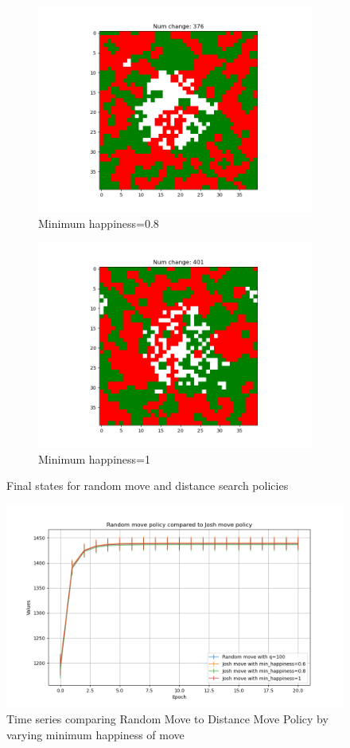 \documentclass[11pt]{article}
\begin{document}
\begin{figure}[h]
\begin{subfigure}{0.14\textwidth}
			\includegraphics[width=\linewidth]{policy4_final_min8.png}
			\caption{\centering Minimum happiness=0.8}
			\label{distance_finalmin8}
		\end{subfigure}\hfill
		\begin{subfigure}{0.14\textwidth}
			\includegraphics[width=\linewidth]{policy4_final_min1.png}
			\caption{\centering Minimum happiness=1}
			\label{distance_finalmin1}
		\end{subfigure}\hfill
		\caption{Final states for random move and distance search policies}
		\label{distance_finalstate}
	\end{figure}
	\vspace{-2em} %
	\FloatBarrier
	\begin{figure}
		\centering
		\includegraphics[width=.5\textwidth]{policies04.png}
		\caption{Time series comparing Random Move to Distance Move Policy by varying minimum happiness of move}
		\label{p4_ts}
	\end{figure}
\end{document}
